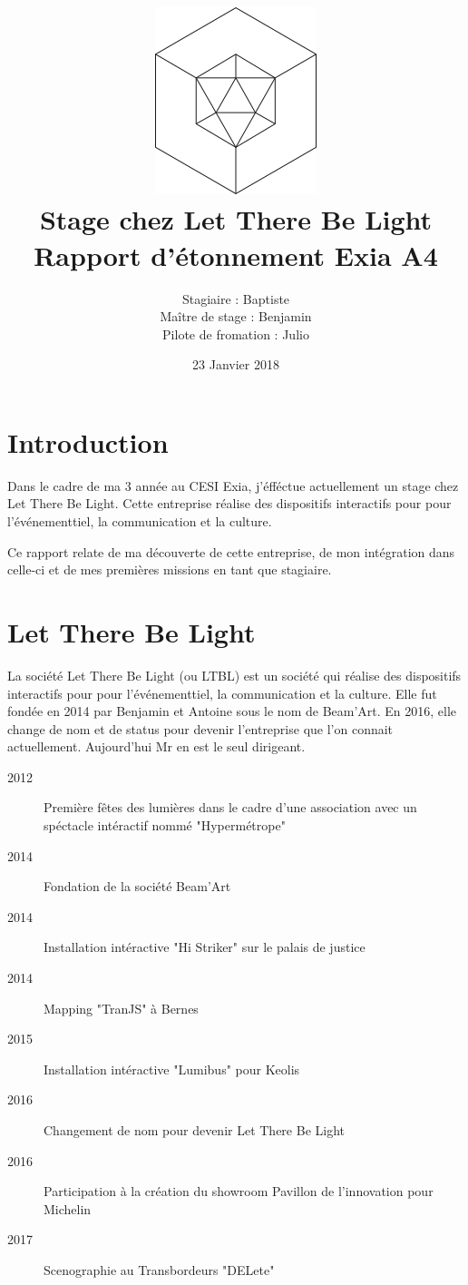 \documentclass{article}
\title{\includegraphics{logo.png}\vspace{2cm}\\Stage chez Let There Be Light \\ \large Rapport d'étonnement Exia A4}
\date{23 Janvier 2018}
\author{Stagiaire : Baptiste \bsc{Saclier} \\ Maître de stage : Benjamin \basc{Petit}\\Pilote de fromation : Julio \basc{Santilario}}
\begin{document}
\maketitle

\clearpage

\tableofcontents

\section{Introduction}

Dans le cadre de ma 3 année au CESI Exia, j'éfféctue actuellement un stage chez Let There Be Light.
Cette entreprise réalise des dispositifs interactifs pour pour l'événementtiel, la communication et la culture.

Ce rapport relate de ma découverte de cette entreprise, de mon intégration dans celle-ci et de mes premières missions en tant que stagiaire.

\clearpage

\section{Let There Be Light}

La société Let There Be Light (ou LTBL) est un société qui réalise des dispositifs interactifs pour pour l'événementtiel, la communication et la culture.
Elle fut fondée en 2014 par Benjamin  et Antoine  sous le nom de Beam'Art.
En 2016, elle change de nom et de status pour devenir l'entreprise que l'on connait actuellement.
Aujourd'hui Mr  en est le seul dirigeant.

\begin{description}
    \item[2012] Première fêtes des lumières dans le cadre d'une association avec un spéctacle intéractif nommé "Hypermétrope"
    \item[2014] Fondation de la société Beam'Art
    \item[2014] Installation intéractive "Hi Striker" sur le palais de justice
    \item[2014] Mapping "TranJS" à Bernes
    \item[2015] Installation intéractive "Lumibus" pour Keolis
    \item[2016] Changement de nom pour devenir Let There Be Light
    \item[2016] Participation à la création du showroom Pavillon de l'innovation pour Michelin
    \item[2017] Scenographie au Transbordeurs "DELete"
\end{description}
\end{document}
